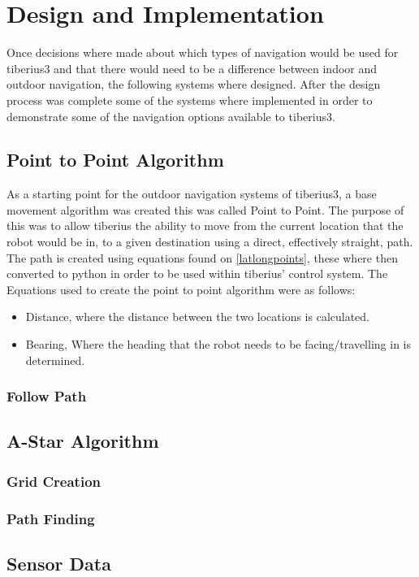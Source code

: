 \section{Design and Implementation}
Once decisions where made about which types of navigation would be used for \gls{tiberius3} and that there would need to be a difference between indoor and outdoor navigation, the following systems where designed. After the design process was complete some of the systems where implemented in order to demonstrate some of the navigation options available to \gls{tiberius3}. 
\subsection{Point to Point Algorithm}
\label{sec:nav_design_p2p} %
As a starting point for the outdoor navigation systems of \gls{tiberius3}, a base movement algorithm was created this was called Point to Point. The purpose of this was to allow tiberius the ability to move from the current location that the robot would be in, to a given destination using a direct, effectively straight, path. The path is created using equations found on \ref{latlongpoints}, these where then converted to python in order to be used within tiberius' control system. The Equations used to create the point to point algorithm were as follows:
\begin{itemize}
\item Distance, where the distance between the two locations is calculated.
\item Bearing, Where the heading that the robot needs to be facing/travelling in is determined.

\end{itemize}
\subsubsection{Follow Path}

\subsection{A-Star Algorithm}

\subsubsection{Grid Creation}

\subsubsection{Path Finding}

\subsection{Sensor Data}